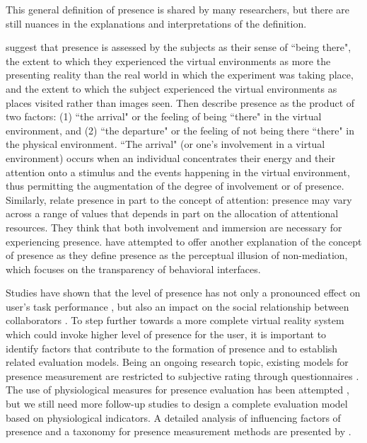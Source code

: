 This general definition of presence is shared by many researchers, but there are still nuances in the explanations and interpretations of the definition.

\citet{Slater1994DepthPre} suggest that presence is assessed by the subjects as their sense of ``being there", the extent to which they experienced the virtual environments as more the presenting reality than the real world in which the experiment was taking place, and the extent to which the subject experienced the virtual environments as places visited rather than images seen. Then \citet{Kim1997Telepresence} describe presence as the product of two factors: (1) ``the arrival" or the feeling of being ``there" in the virtual environment, and (2) ``the departure" or the feeling of not being there ``there" in the physical environment. ``The arrival" (or one's involvement in a virtual environment) occurs when an individual concentrates their energy and their attention onto a stimulus and the events happening in the virtual environment, thus permitting the augmentation of the degree of involvement or of presence. Similarly, \citet{Witmer1998MPV} relate presence in part to the concept of attention: presence may vary across a range of values that depends in part on the allocation of attentional resources. They think that both involvement and immersion are necessary for experiencing presence. \citet{Lombard1997Heart} have attempted to offer another explanation of the concept of presence as they define presence as the perceptual illusion of non-mediation, which focuses on the transparency of behavioral interfaces.

Studies have shown that the level of presence has not only a pronounced effect on user's task performance \citep{Dangelo2008Benefits}, but also an impact on the social relationship between collaborators \citep{Slater2000Small}. To step further towards a more complete virtual reality system which could invoke higher level of presence for the user, it is important to identify factors that contribute to the formation of presence and to establish related evaluation models. Being an ongoing research topic, existing models for presence measurement are restricted to subjective rating through questionnaires \citep{Usoh2000Using, Witmer1998MPV}. The use of physiological measures for presence evaluation has been attempted \citep{Meehan2002Physiological}, but we still need more follow-up studies to design a complete evaluation model based on physiological indicators. A detailed analysis of influencing factors of presence and a taxonomy for presence measurement methods are presented by \citet{Schuemie2001Pres}.


